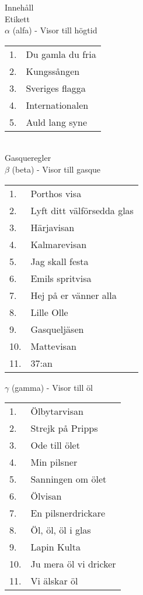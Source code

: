 \documentclass[a6paper,10pt]{article}
\begin{document}
\noindent
\huge{Innehåll}
\vspace{5pt}\\
\Large Etikett 
\vspace{5pt}\\
\Large $\alpha$ (alfa) - Visor till högtid
\vspace{-10pt}
\begin{table}[!h]
\begin{tabularx}{0.55\textwidth}{l X}
1.&Du gamla du fria\\
2.&Kungssången\\
3.&Sveriges flagga\\
4.&Internationalen\\
5.&Auld lang syne
\end{tabularx}
\end{table}
\vspace{-5pt}\\
\Large Gasqueregler
\vspace{5pt}\\
\Large $\beta$ (beta) - Visor till gasque
\vspace{-10pt}
\begin{table}[!h]
\begin{tabularx}{0.65\textwidth}{l X}
1.&Porthos visa\\
2.&Lyft ditt välförsedda glas\\
3.&Härjavisan\\
4.&Kalmarevisan\\
5.&Jag skall festa \\
6.&Emils spritvisa\\
7.&Hej på er vänner alla\\
8.&Lille Olle\\
9.&Gasqueljäsen\\
10.&Mattevisan\\
11.&37:an
\end{tabularx}
\end{table}

\newpage
\setlength{\oddsidemargin}{-0.47in}
\noindent
\Large $\gamma$ (gamma) - Visor till öl
\vspace{-10pt}
\begin{table}[!h]
\begin{tabularx}{0.65\textwidth}{l X}
1.&Ölbytarvisan\\
2.&Strejk på Pripps\\
3.&Ode till ölet\\
4.&Min pilsner\\
5.&Sanningen om ölet \\
6.&Ölvisan\\
7.&En pilsnerdrickare\\
8.&Öl, öl, öl i glas\\
9.&Lapin Kulta\\
10.&Ju mera öl vi dricker\\
11.&Vi älskar öl
\end{tabularx}
\end{table}
\end{document}
